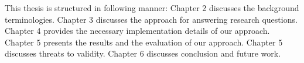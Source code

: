 This thesis is structured in following manner: Chapter 2 discusses the background terminologies. Chapter 3 discusses the approach for answering research questions. Chapter 4 provides the necessary implementation details of our approach. Chapter 5 presents the results and the evaluation of our approach. Chapter 5 discusses threats to validity. Chapter 6 discusses conclusion and future work. 

